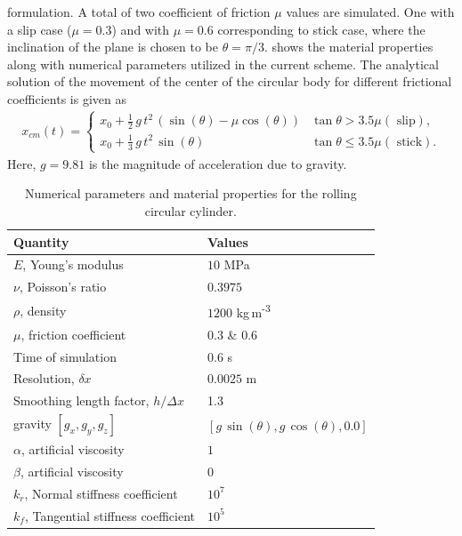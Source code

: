 formulation. A total of two coefficient of friction $\mu$ values are
simulated. One with a slip case ($\mu=0.3$) and with $\mu=0.6$ corresponding
to stick case, where the inclination of the plane is chosen to be
$\theta=\pi/3$.  shows the material
properties along with numerical parameters utilized in the current scheme. The
analytical solution of the movement of the center of the circular body for
different frictional coefficients is given as
\begin{align}
  \label{eq:analytical-x-cm-rolling-cylinder}
  x_{cm}(t) =
  \begin{cases}
  x_0 + \frac{1}{2} \, g \, t^2 \, (\sin(\theta) - \mu \cos(\theta)) & \tan{\theta} > 3.5\mu (\text{ slip}),\\
  x_0 + \frac{1}{3} \, g \, t^2 \, \sin(\theta) & \tan{\theta} \leq 3.5\mu (\text{ stick}).
\end{cases}
\end{align}
Here, $g=9.81$ is the magnitude of acceleration due to gravity.

\begin{table}[!ht]
  \centering
  \begin{tabular}[!ht]{ll}
    \toprule
    Quantity & Values\\
    \midrule
    $E$, Young's modulus & $10$ MPa \\
    $\nu$, Poisson's ratio & $0.3975$ \\
    $\rho$, density & $1200$ kg\,m\textsuperscript{-3} \\
    $\mu$, friction coefficient & $0.3$ \& $0.6$ \\
    Time of simulation & $0.6$ s \\
    Resolution, $\delta x$ & $0.0025$ m\\
    Smoothing length factor, $h/\Delta x$ & 1.3\\
    gravity $[g_x, g_y, g_z]$ & $[g\,\sin(\theta), g\,\cos(\theta), 0.0]$\\
    $\alpha$, artificial viscosity & $1$ \\
    $\beta$, artificial viscosity & $0$ \\
    $k_r$, Normal stiffness coefficient & $10^{7}$ \\
    $k_f$, Tangential stiffness coefficient & $10^{5}$ \\
    \bottomrule
  \end{tabular}
  \caption{Numerical parameters and material properties for the rolling circular
    cylinder.}%
  \label{tab:circular-cylinder-rolling}
\end{table}

